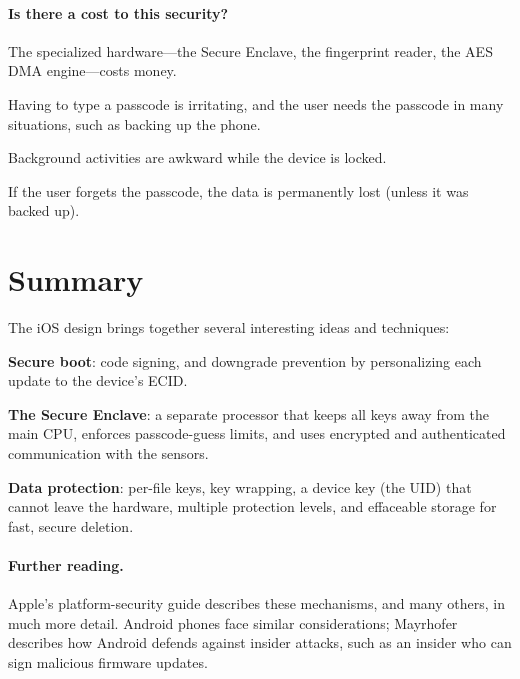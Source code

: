 \paragraph{Is there a cost to this security?}
\begin{compactitem}
  \item The specialized hardware---the Secure Enclave, the fingerprint
        reader, the AES DMA engine---costs money.
  \item Having to type a passcode is irritating, and the user needs the
        passcode in many situations, such as backing up the phone.
  \item Background activities are awkward while the device is locked.
  \item If the user forgets the passcode, the data is permanently lost
        (unless it was backed up).
\end{compactitem}

\section{Summary}

The iOS design brings together several interesting ideas and techniques:
\begin{compactitem}
  \item \textbf{Secure boot}: code signing, and downgrade prevention by
        personalizing each update to the device's ECID.
  \item \textbf{The Secure Enclave}: a separate processor that keeps all
        keys away from the main CPU, enforces passcode-guess limits, and
        uses encrypted and authenticated communication with the sensors.
  \item \textbf{Data protection}: per-file keys, key wrapping, a device key
        (the UID) that cannot leave the hardware, multiple protection levels,
        and effaceable storage for fast, secure deletion.
\end{compactitem}

\paragraph{Further reading.}
Apple's platform-security guide\autocite{apple:platform-security}
describes these mechanisms, and many others, in much more detail.
Android phones face similar considerations; Mayrhofer describes how
Android defends against insider attacks, such as an insider who can sign
malicious firmware updates.\autocite{mayrhofer:insider}
